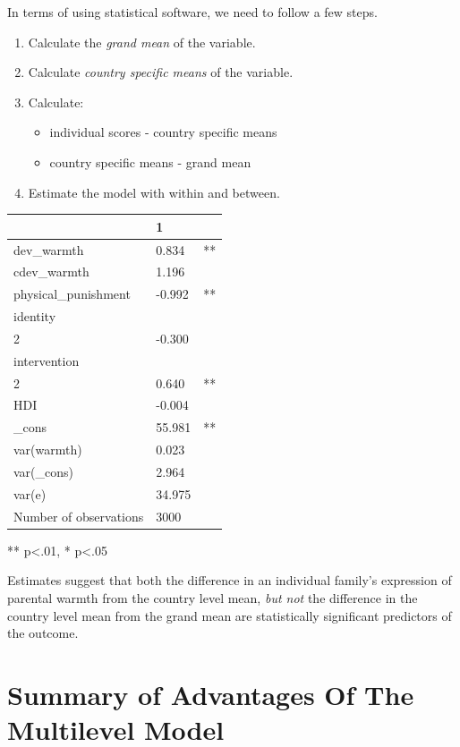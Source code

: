 \documentclass[
  letterpaper,
  DIV=11,
  numbers=noendperiod]{scrreprt}
\providecommand{\tightlist}{%
  \setlength{\itemsep}{0pt}\setlength{\parskip}{0pt}}\usepackage{longtable,booktabs,array}
\begin{document}
In terms of using statistical software, we need to follow a few steps.

\begin{enumerate}
\def\labelenumi{\arabic{enumi}.}
\item
  Calculate the \emph{grand mean} of the variable.
\item
  Calculate \emph{country specific means} of the variable.
\item
  Calculate:

  \begin{itemize}
  \tightlist
  \item
    individual scores - country specific means
  \item
    country specific means - grand mean
  \end{itemize}
\item
  Estimate the model with within and between.
\end{enumerate}

\begin{longtable}[]{@{}lll@{}}
\toprule\noalign{}
& 1 & \\
\midrule\noalign{}
\endhead
\bottomrule\noalign{}
\endlastfoot
dev\_warmth & 0.834 & ** \\
cdev\_warmth & 1.196 & \\
physical\_punishment & -0.992 & ** \\
identity & & \\
2 & -0.300 & \\
intervention & & \\
2 & 0.640 & ** \\
HDI & -0.004 & \\
\_cons & 55.981 & ** \\
var(warmth) & 0.023 & \\
var(\_cons) & 2.964 & \\
var(e) & 34.975 & \\
Number of observations & 3000 & \\
\end{longtable}

** p\textless.01, * p\textless.05

Estimates suggest that both the difference in an individual family's
expression of parental warmth from the country level mean, \emph{but
not} the difference in the country level mean from the grand mean are
statistically significant predictors of the outcome.

\section{Summary of Advantages Of The Multilevel
Model}\label{summary-of-advantages-of-the-multilevel-model}
\end{document}
